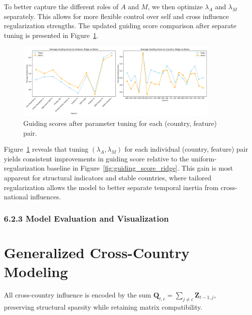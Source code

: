 \documentclass[12pt]{article}
\begin{document}
To better capture the different roles of \( A \) and \( M \), we then optimize \(\lambda_A\) and \(\lambda_M\) separately. This allows for more flexible control over self and cross influence regularization strengths. 
The updated guiding score comparison after separate tuning is presented in Figure~\ref{fig:guiding_score_ridge2}.

\begin{figure}[H]
  \centering
  \includegraphics[width=0.9\textwidth]{guiding_score_ridge2.png}
  \caption{Guiding scores after parameter tuning for each (country, feature) pair.}
  \label{fig:guiding_score_ridge2}
\end{figure}

Figure~\ref{fig:guiding_score_ridge2} reveals that tuning $(\lambda_A, \lambda_M)$ for each individual (country, feature) pair yields consistent improvements in guiding score relative to the uniform-regularization baseline in Figure~\ref{fig:guiding_score_ridge}. 
This gain is most apparent for structural indicators and stable countries, where tailored regularization allows the model to better separate temporal inertia from cross-national influences. 


\subsubsection*{6.2.3 Model Evaluation and Visualization}




\section{Generalized Cross-Country Modeling}

All cross-country influence is encoded by the sum $\mathbf{Q}_{t,c} = \sum_{j \ne c} \mathbf{Z}_{t-1,j}$, preserving structural sparsity while retaining matrix compatibility.
\end{document}
